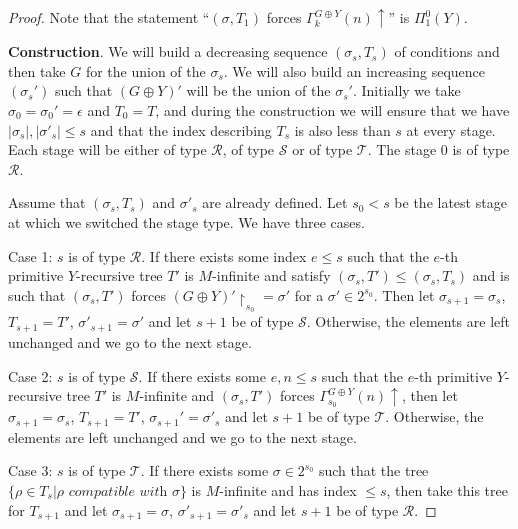 \documentclass{article}
\numberwithin{theorem}{section}
\newcommand{\BSig}{\mathsf{B}\Sigma^0}
\newcommand{\uh}[0]{{\upharpoonright}}
\def\qt#1{``#1''}%
\begin{document}
\begin{proof}
Note that the statement \qt{$(\sigma, T_1)$ forces $\Gamma_k^{G \oplus Y}(n)\uparrow$} is $\Pi^0_1(Y)$.
\bigskip

\textbf{Construction}. We will build a decreasing sequence $(\sigma_s, T_s)$ of conditions and then take $G$ for the union of the $\sigma_s$. We will also build an increasing sequence $(\sigma_s')$ such that $(G \oplus Y)'$ will be the union of the $\sigma_s'$. Initially we take $\sigma_0 = \sigma_0' = \epsilon$ and $T_0 = T$, and during the construction we will ensure that we have $|\sigma_s|,|\sigma'_s| \leq s$ and that the index describing $T_s$ is also less than $s$ at every stage. Each stage will be either of type $\mathcal{R}$, of type $\mathcal{S}$ or of type $\mathcal{T}$. The stage $0$ is of type $\mathcal{R}$.

Assume that $(\sigma_s, T_s)$ and $\sigma'_s$ are already defined. Let $s_0 < s$ be the latest stage at which we switched the stage type. We have three cases.

Case 1: $s$ is of type $\mathcal{R}$. If there exists some index $e \leq s$ such that the $e$-th primitive $Y$-recursive tree $T'$ is $M$-infinite and satisfy $(\sigma_s,T') \leq (\sigma_s, T_s)$ and is such that $(\sigma_s,T')$ forces $(G \oplus Y)' \uh_{s_0} = \sigma'$ for a $\sigma' \in 2^{s_0}$. Then let $\sigma_{s+1} = \sigma_s$, $T_{s+1} = T'$, $\sigma'_{s+1} = \sigma'$ and let $s+1$ be of type $\mathcal{S}$. Otherwise, the elements are left unchanged and we go to the next stage.

Case 2: $s$ is of type $\mathcal{S}$. If there exists some $e, n \leq s$ such that the $e$-th primitive $Y$-recursive tree $T'$ is $M$-infinite and $(\sigma_s, T')$ forces $\Gamma_{s_0}^{G \oplus Y}(n)\uparrow$, then let $\sigma_{s+1} = \sigma_s$, $T_{s+1} = T'$, $\sigma_{s+1}' = \sigma'_s$ and let $s+1$ be of type $\mathcal{T}$. Otherwise, the elements are left unchanged and we go to the next stage.

Case 3: $s$ is of type $\mathcal{T}$. If there exists some $\sigma \in 2^{s_0}$ such that the tree $\{\rho \in T_s | \rho \textit{ compatible with } \sigma\}$ is $M$-infinite and has index $\leq s$, then take this tree for $T_{s+1}$ and let $\sigma_{s+1} = \sigma$, $\sigma'_{s+1} = \sigma'_s$ and let $s+1$ be of type $\mathcal{R}$.



\end{proof}
\end{document}
